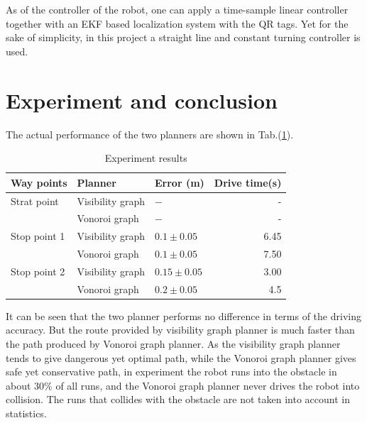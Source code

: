 \documentclass[12pt]{article}
\begin{document}
As of the controller of the robot, one can apply a time-sample linear controller together with an EKF based localization system with the QR tags. Yet for the sake of simplicity, in this project a straight line and constant turning controller is used.



\section{Experiment and conclusion}
The actual performance of the two planners are shown in Tab.(\ref{tab1}). 
\begin{table}[hp]
\centering
\caption{Experiment results}
\label{tab1}
\begin{tabular}{lllr}

Way points    & Planner & Error (m) & Drive time(s)\\
\hline
Strat point      & Visibility graph    & $- $ &-   \\
          & Vonoroi graph        & $- $ &-     \\
Stop point 1       & Visibility graph     & $0.1 \pm 0.05$ &    6.45 \\
		& Vonoroi graph     &$0.1 \pm 0.05$ &     7.50\\
Stop point 2         & Visibility graph     & $0.15 \pm 0.05$    &3.00 \\
		 & Vonoroi graph      & $0.2 \pm 0.05$   &    4.5\\
\hline
\end{tabular}
\end{table}
It can be seen that the two planner performs no difference in terms of the driving accuracy. But the route provided by visibility graph planner is much faster than the path produced by Vonoroi graph planner. As the visibility graph planner tends to give dangerous yet optimal path, while the Vonoroi graph planner gives safe yet conservative path, in experiment the robot runs into the obstacle in about $30\%$ of all runs, and the Vonoroi graph planner never drives the robot into collision. The runs that collides with the obstacle are not taken into account in statistics. 
\end{document}
